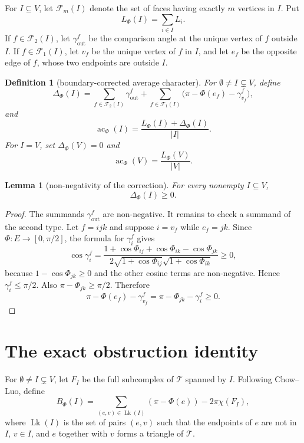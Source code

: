 \documentclass[11pt]{article}
\newtheorem{lemma}[theorem]{Lemma}
\newtheorem{definition}[theorem]{Definition}
\newcommand{\T}{\mathcal T}
\newcommand{\Phiw}{\Phi}
\newcommand{\Lk}{\operatorname{Lk}}
\newcommand{\ac}{\operatorname{ac}}
\begin{document}
For $I\subseteq V$, let $\mathcal F_m(I)$ denote the set of faces having
exactly $m$ vertices in $I$.  Put
\[
  L_\Phi(I)=\sum_{i\in I}L_i .
\]
If $f\in\mathcal F_2(I)$, let $\gamma_{\mathrm{out}}^f$ be the comparison
angle at the unique vertex of $f$ outside $I$.  If $f\in\mathcal F_1(I)$,
let $v_f$ be the unique vertex of $f$ in $I$, and let $e_f$ be the opposite
edge of $f$, whose two endpoints are outside $I$.

\begin{definition}[boundary-corrected average character]
For $\emptyset\ne I\subsetneq V$, define
\[
  \Delta_\Phi(I)
  =
  \sum_{f\in\mathcal F_2(I)}\gamma_{\mathrm{out}}^f
  +
  \sum_{f\in\mathcal F_1(I)}
    \bigl(\pi-\Phiw(e_f)-\gamma_{v_f}^f\bigr),
\]
and
\[
  \ac_\Phi(I)=\frac{L_\Phi(I)+\Delta_\Phi(I)}{|I|}.
\]
For $I=V$, set $\Delta_\Phi(V)=0$ and
\[
  \ac_\Phi(V)=\frac{L_\Phi(V)}{|V|}.
\]
\end{definition}

\begin{lemma}[non-negativity of the correction]
For every nonempty $I\subseteq V$,
\[
  \Delta_\Phi(I)\ge 0.
\]
\end{lemma}

\begin{proof}
The summands $\gamma_{\mathrm{out}}^f$ are non-negative.  It remains to
check a summand of the second type.  Let $f=ijk$ and suppose $i=v_f$ while
$e_f=jk$.  Since $\Phiw:E\to[0,\pi/2]$, the formula for $\gamma_i^f$ gives
\[
 \cos \gamma_i^f
 =
 \frac{1+\cos\Phiw_{ij}+\cos\Phiw_{ik}-\cos\Phiw_{jk}}
      {2\sqrt{1+\cos\Phiw_{ij}}\sqrt{1+\cos\Phiw_{ik}}}
 \ge 0,
\]
because $1-\cos\Phiw_{jk}\ge0$ and the other cosine terms are
non-negative.  Hence $\gamma_i^f\le\pi/2$.  Also
$\pi-\Phiw_{jk}\ge\pi/2$.  Therefore
\[
  \pi-\Phiw(e_f)-\gamma_{v_f}^f
  =
  \pi-\Phiw_{jk}-\gamma_i^f
  \ge 0.
\]
\end{proof}

\section{The exact obstruction identity}

For $\emptyset\ne I\subsetneq V$, let $F_I$ be the full subcomplex of
$\T$ spanned by $I$.  Following Chow--Luo, define
\[
  B_\Phi(I)
  =
  \sum_{(e,v)\in\Lk(I)}(\pi-\Phiw(e))-2\pi\chi(F_I),
\]
where $\Lk(I)$ is the set of pairs $(e,v)$ such that the endpoints of $e$
are not in $I$, $v\in I$, and $e$ together with $v$ forms a triangle of
$\T$.
\end{document}
